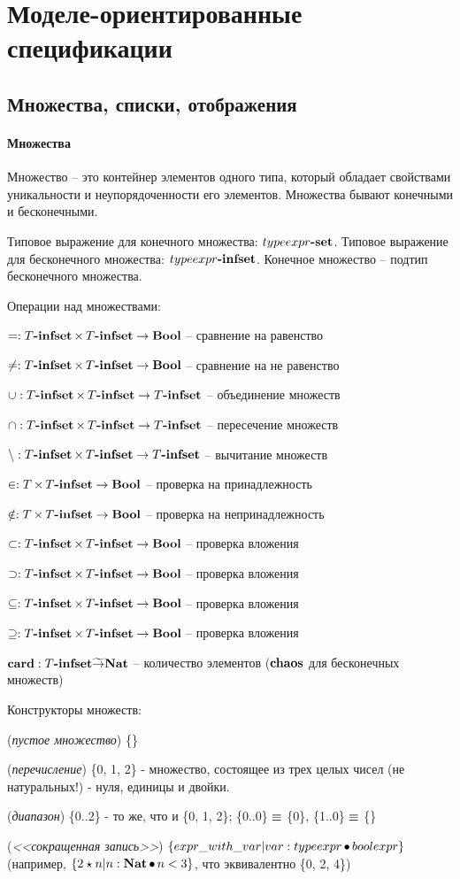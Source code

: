 \documentclass[14pt, twoside]{extreport}
\newcommand{\head}[1]{\vspace{1cm}\subsubsection*{#1}}
\begin{document}
\chapter{Моделе-ориентированные спецификации}

\section{Множества, списки, отображения}

\head{Множества}
Множество -- это контейнер элементов одного типа, который обладает свойствами уникальности и неупорядоченности его элементов. Множества бывают конечными и бесконечными.

Типовое выражение для конечного множества: $typeexpr\textbf{-set}$. Типовое выражение для бесконечного множества: $typeexpr\textbf{-infset}$. Конечное множество -- подтип бесконечного множества.

Операции над множествами:
\begin{list}{}{}
\item $= : T\textbf{-infset} \mathop{\times} T\textbf{-infset} \rightarrow \textbf{Bool}$ -- сравнение на равенство
\item $\neq : T\textbf{-infset} \mathop{\times} T\textbf{-infset} \rightarrow \textbf{Bool}$ -- сравнение на не равенство
\item $\mathop{\cup}: T\textbf{-infset} \mathop{\times} T\textbf{-infset} \rightarrow T\textbf{-infset}$ -- объединение множеств
\item $\mathop{\cap}: T\textbf{-infset} \mathop{\times} T\textbf{-infset} \rightarrow T\textbf{-infset}$ -- пересечение множеств
\item $\mathop{\setminus}: T\textbf{-infset} \mathop{\times} T\textbf{-infset} \rightarrow T\textbf{-infset}$ -- вычитание множеств
\item $\in: T \mathop{\times} T\textbf{-infset} \rightarrow \textbf{Bool}$ -- проверка на принадлежность
\item $\notin: T \mathop{\times} T\textbf{-infset} \rightarrow \textbf{Bool}$ -- проверка на непринадлежность
\item $\subset: T\textbf{-infset} \mathop{\times} T\textbf{-infset} \rightarrow \textbf{Bool}$ -- проверка вложения
\item $\supset: T\textbf{-infset} \mathop{\times} T\textbf{-infset} \rightarrow \textbf{Bool}$ -- проверка вложения
\item $\subseteq: T\textbf{-infset} \mathop{\times} T\textbf{-infset} \rightarrow \textbf{Bool}$ -- проверка вложения
\item $\supseteq: T\textbf{-infset} \mathop{\times} T\textbf{-infset} \rightarrow \textbf{Bool}$ -- проверка вложения
\item $\mathop{\textbf{card}}: T\textbf{-infset} \widetilde{\rightarrow} \textbf{Nat}$ -- количество элементов
($\textbf{chaos}$ для бесконечных множеств)
\end{list}


Конструкторы множеств:
\begin{list}{}{}
\item (\emph{пустое множество}) \{\}
\item (\emph{перечисление}) \{0, 1, 2\} - множество, состоящее из трех целых чисел (не
натуральных!) - нуля, единицы и двойки.
\item (\emph{диапазон}) \{0..2\} -  то же, что и \{0, 1, 2\};
\{0..0\} $\mathop{\equiv}$ \{0\}, \{1..0\} $\mathop{\equiv}$ \{\}
\item (\emph{<<сокращенная запись>>}) $\{ expr\_with\_var | var : typeexpr
\mathop{\bullet} boolexpr\}$ (например, $\{2 \star n | n : \textbf{Nat} \mathop{\bullet} n < 3
\}$, что эквивалентно \{0, 2, 4\})
\end{list}
\end{document}
